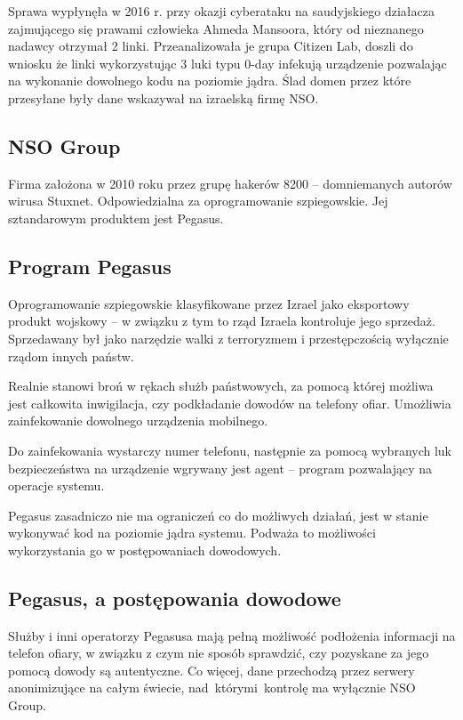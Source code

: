 \documentclass{article}
\begin{document}
Sprawa wypłynęła w 2016 r. przy okazji cyberataku na saudyjskiego działacza zajmującego się prawami człowieka Ahmeda Mansoora, który od nieznanego nadawcy otrzymał 2 linki. Przeanalizowała je grupa Citizen Lab, doszli do wniosku że linki wykorzystując 3 luki typu 0-day infekują urządzenie pozwalając na wykonanie dowolnego kodu na poziomie jądra. Ślad domen przez które przesyłane były dane wskazywał na izraelską firmę NSO.

\subsection{NSO Group}

Firma założona w 2010 roku przez grupę hakerów 8200 -- domniemanych autorów wirusa Stuxnet. Odpowiedzialna za oprogramowanie szpiegowskie. Jej sztandarowym produktem jest Pegasus.

\subsection{Program Pegasus}

Oprogramowanie szpiegowskie klasyfikowane przez Izrael jako eksportowy produkt wojskowy -- w związku z tym to rząd Izraela kontroluje jego sprzedaż. Sprzedawany był jako narzędzie walki z terroryzmem i przestępczością wyłącznie rządom innych państw.

Realnie stanowi broń w rękach służb państwowych, za pomocą której możliwa jest całkowita inwigilacja, czy podkładanie dowodów na telefony ofiar.
Umożliwia zainfekowanie dowolnego urządzenia mobilnego.

Do zainfekowania wystarczy numer telefonu, następnie za pomocą wybranych luk bezpieczeństwa na urządzenie wgrywany jest agent -- program pozwalający na operacje systemu.

Pegasus zasadniczo nie ma ograniczeń co do możliwych działań, jest w stanie wykonywać kod na poziomie jądra systemu. Podważa to możliwości wykorzystania go w postępowaniach dowodowych.

\subsection{Pegasus, a postępowania dowodowe}

Służby i inni operatorzy Pegasusa mają pełną możliwość podłożenia informacji na telefon ofiary, w związku z czym nie sposób sprawdzić, czy pozyskane za jego pomocą dowody są autentyczne. Co więcej, dane przechodzą przez serwery anonimizujące na całym świecie, nad~którymi~kontrolę ma wyłącznie NSO Group.
\end{document}
